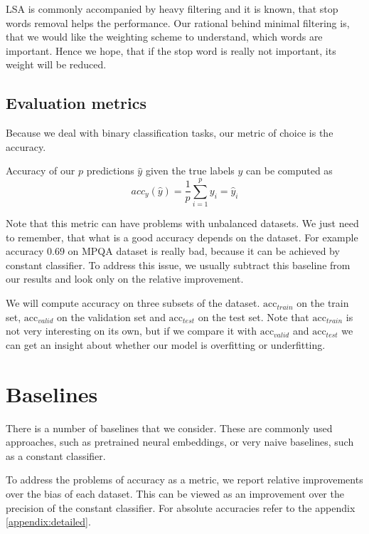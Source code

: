     LSA is commonly accompanied by heavy filtering and it is known, that stop words removal helps the performance.
    Our rational behind minimal filtering is, that we would like the weighting scheme to understand, which words are important.
    Hence we hope, that if the stop word is really not important, its weight will be reduced.
    
    \subsection{Evaluation metrics}
    
    Because we deal with binary classification tasks, our metric of choice is the accuracy.
    
    Accuracy of our $p$ predictions $\hat{y}$ given the true labels $y$ can be computed as
    $$acc_y(\hat{y}) = \frac{1}{p}\sum_{i=1}^py_i =\hat{y}_i$$
    
    Note that this metric can have problems with unbalanced datasets. 
    We just need to remember, that what is a good accuracy depends on the dataset.
    For example accuracy $0.69$ on MPQA dataset is really bad, because it can be achieved by constant classifier.
    To address this issue, we usually subtract this baseline from our results and look only on the relative improvement. 
    
    We will compute accuracy on three subsets of the dataset. 
    $\mathrm{acc}_{train}$ on the train set, $\mathrm{acc}_{valid}$ on the validation set and $\mathrm{acc}_{test}$ on the test set.
    Note that $\mathrm{acc}_{train}$ is not very interesting on its own, but if we compare it with $\mathrm{acc}_{valid}$ and $\mathrm{acc}_{test}$ we can get an insight about whether our model is overfitting or underfitting.


\section{Baselines} \label{sec:baseline}

    There is a number of baselines that we consider.
    These are commonly used approaches, such as pretrained neural embeddings, or very naive baselines, such as a constant classifier.
    
    To  address the problems of accuracy as a metric, we report relative improvements over the bias of each dataset.
    This can be viewed as an improvement over the precision of the constant classifier.
    For absolute accuracies refer to the appendix \ref{appendix:detailed}. 

